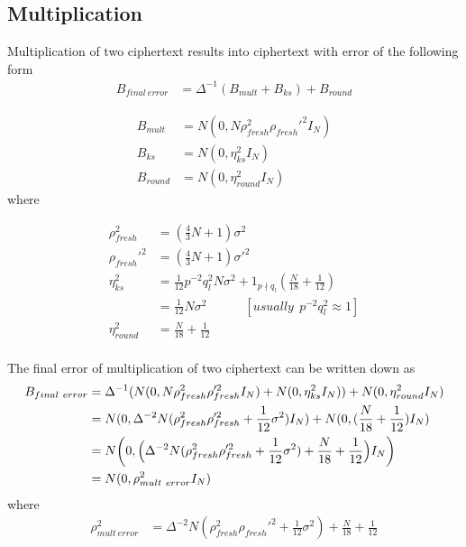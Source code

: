 \documentclass[a4paper,10pt]{article}
\begin{document}
\subsection{Multiplication} Multiplication of two ciphertext results into ciphertext with error of the
following form
\begin{align}
    B_{final\ error} &= \Delta^{-1}(B_{mult}+B_{ks})+B_{round}
\end{align}

\begin{align*}
B_{mult} &= N(0,N\rho_{fresh}^2\rho_{fresh}'^2I_N) \\
  B_{ks} &= N(0,\eta_{ks}^2I_N) \\
  B_{round} &= N(0,\eta_{round}^2 I_N)
\end{align*}
where

\begin{align*}
\rho_{fresh}^2 &=(\frac{4}{3}N+1)\sigma^2 \\
\rho_{fresh}'^2 &=(\frac{4}{3}N+1)\sigma'^2 \\
\eta_{ks}^2     &=\frac{1}{12}p^{-2}q^2_{l}N\sigma^2+1_{p \nmid q_l}(\frac{N}{18}+\frac{1}{12}) \\
                &=\frac{1}{12} N\sigma^2 \hspace{3em}[usually\ \ p^{-2}q^2_{l}\approx 1]\\
\eta^2_{round}  &= \frac{N}{18} + \frac{1}{12}\\
\end{align*}

The final error of multiplication of two ciphertext can be written down as
\begin{align}
    B_{final\ error} &= \Delta^{-1}(N(0,N\rho_{fresh}^2\rho_{fresh}'^2I_N)+ N(0,\eta_{ks}^2I_N))+N(0,\eta_{round}^2 I_N) \nonumber \\
                     &= N(0,\Delta^{-2}N(\rho_{fresh}^2\rho_{fresh}'^2+\frac{1}{12}\sigma^2)I_N) + N(0,(\frac{N}{18}+\frac{1}{12})I_N) \nonumber \\
                     &= N \biggl(0,\Bigl(\Delta^{-2}N(\rho_{fresh}^2\rho_{fresh}'^2+\frac{1}{12}\sigma^2)+\frac{N}{18}+\frac{1}{12}\Bigr)I_N\biggl) \nonumber \\
                     &=N(0,\rho_{mult\ error}^2I_N)
\end{align}
where
\begin{align*}
\rho_{mult\ error}^2 &= \Delta^{-2}N(\rho_{fresh}^2\rho_{fresh}'^2+\frac{1}{12}\sigma^2)+\frac{N}{18}+\frac{1}{12}  \\
\end{align*}
\end{document}
